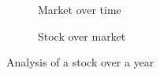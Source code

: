 \begin{figure}[h]
  \centering
  \begin{subfigure}[t]{0.45\textwidth}
    
    \caption{Market over time}
    \label{fig:stock:it:market-over-time}
  \end{subfigure}
  \quad
  \begin{subfigure}[t]{0.45\textwidth}
    
    \caption{Stock over market}
    \label{fig:stock:it:stock-over-market}
  \end{subfigure}

  \caption{Analysis of a stock over a year}
  \label{fig:stock:it}
\end{figure}

